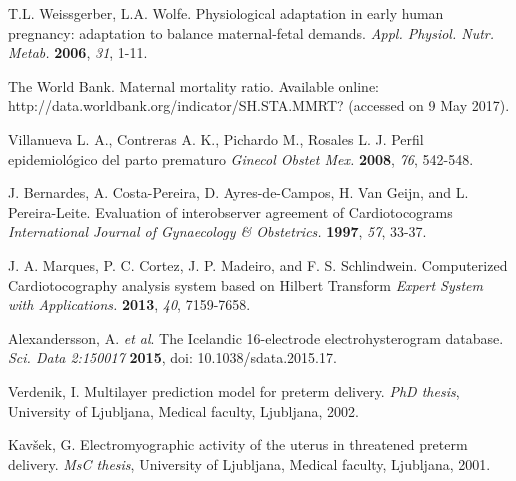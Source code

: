 \documentclass[bioengineering,article,submit,moreauthors,pdftex,10pt,a4paper]{mdpi}
\begin{document}
\begin{thebibliography}{999}
	
T.L. Weissgerber, L.A. Wolfe. Physiological adaptation in early human pregnancy: adaptation to balance maternal-fetal demands. {\em Appl. Physiol. Nutr. Metab.} {\bf 2006}, {\em 31}, 1-11.

The World Bank. Maternal mortality ratio. Available online: http://data.worldbank.org/indicator/SH.STA.MMRT? (accessed on 9 May 2017).

Villanueva L. A., Contreras A. K., Pichardo M., Rosales L. J. Perfil epidemiológico del parto prematuro {\em Ginecol Obstet Mex.} {\bf 2008}, {\em 76}, 542-548. 

J. Bernardes, A. Costa-Pereira, D. Ayres-de-Campos, H. Van Geijn, and L. Pereira-Leite. Evaluation of interobserver agreement of Cardiotocograms {\em International Journal of Gynaecology \& Obstetrics.} {\bf 1997}, {\em 57}, 33-37.

J. A. Marques, P. C. Cortez, J. P. Madeiro, and F. S. Schlindwein. Computerized Cardiotocography analysis system based on Hilbert Transform {\em Expert System with Applications.} {\bf 2013}, {\em 40}, 7159-7658.		
	
Alexandersson, A. { \em et al}.  The Icelandic 16-electrode electrohysterogram database. {\em Sci. Data 2:150017} {\bf 2015}, doi: 10.1038/sdata.2015.17.

Verdenik, I.  Multilayer prediction model for preterm delivery. {\em PhD thesis}, University of Ljubljana, Medical faculty, Ljubljana, 2002.

Kavšek, G.  Electromyographic activity of the uterus in threatened preterm delivery. {\em MsC thesis}, University of Ljubljana, Medical faculty, Ljubljana, 2001.



\end{thebibliography}
\end{document}
